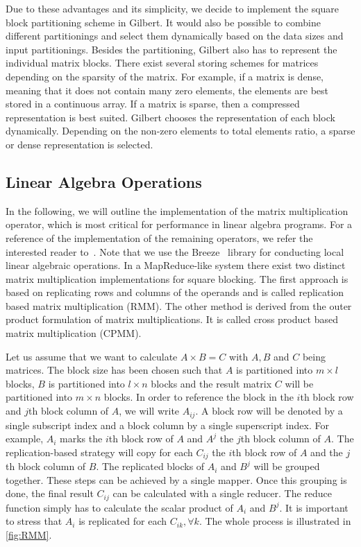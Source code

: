 Due to these advantages and its simplicity, we decide to implement the square block partitioning scheme in Gilbert. 
It would also be possible to combine different partitionings and select them dynamically based on the data sizes and input partitionings. 
Besides the partitioning, Gilbert also has to represent the individual matrix blocks. There exist several storing schemes for matrices depending on the sparsity of the matrix. 
For example, if a matrix is dense, meaning that it does not contain many zero elements, the elements are best stored in a continuous array. 
If a matrix is sparse, then a compressed representation is best suited. 
Gilbert chooses the representation of each block dynamically. 
Depending on the non-zero elements to total elements ratio, a sparse or dense representation is selected.

\subsection{Linear Algebra Operations}
\label{sec:LinearAlgebraOperations}

In the following, we will outline the implementation of the matrix multiplication operator, which is most critical for performance in linear algebra programs. 
For a reference of the implementation of the remaining operators, we refer the interested reader to~\cite{Rohrmann2014}. 
Note that we use the Breeze~\cite{breeze} library for conducting local linear algebraic operations. 
In a MapReduce-like system there exist two distinct matrix multiplication implementations for square blocking. 
The first approach is based on replicating rows and columns of the operands and is called replication based matrix multiplication (RMM). 
The other method is derived from the outer product formulation of matrix multiplications. 
It is called cross product based matrix multiplication (CPMM). 

Let us assume that we want to calculate $A \times B = C$ with $A,B$ and $C$ being matrices. 
The block size has been chosen such that $A$ is partitioned into $m\times l$ blocks, $B$ is partitioned into $l \times n$ blocks and the result matrix $C$ will be partitioned into $m\times n$ blocks. 
In order to reference the block in the $i$th block row and $j$th block column of $A$, we will write $A_{ij}$. 
A block row will be denoted by a single subscript index and a block column by a single superscript index. 
For example, $A_i$ marks the $i$th block row of $A$ and $A^j$ the $j$th block column of $A$. 
The replication-based strategy will copy for each $C_{ij}$ the $i$th block row of $A$ and the $j$th block column of $B$. 
The replicated blocks of $A_i$ and $B^j$ will be grouped together. 
These steps can be achieved by a single mapper. 
Once this grouping is done, the final result $C_{ij}$ can be calculated with a single reducer. 
The reduce function simply has to calculate the scalar product of $A_i$ and $B^j$. 
It is important to stress that $A_i$ is replicated for each $C_{ik},\forall k$. 
The whole process is illustrated in \cref{fig:RMM}.

